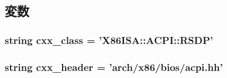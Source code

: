 \subsection{変数}
\hypertarget{classACPI_1_1X86ACPIRSDP_a58cd55cd4023648e138237cfc0822ae3}{
\subsubsection[{cxx\_\-class}]{\setlength{\rightskip}{0pt plus 5cm}string {\bf cxx\_\-class} = '{\bf X86ISA::ACPI::RSDP}'}}
\label{classACPI_1_1X86ACPIRSDP_a58cd55cd4023648e138237cfc0822ae3}
\hypertarget{classACPI_1_1X86ACPIRSDP_a17da7064bc5c518791f0c891eff05fda}{
\subsubsection[{cxx\_\-header}]{\setlength{\rightskip}{0pt plus 5cm}string {\bf cxx\_\-header} = 'arch/x86/bios/acpi.hh'}}
\label{classACPI_1_1X86ACPIRSDP_a17da7064bc5c518791f0c891eff05fda}


